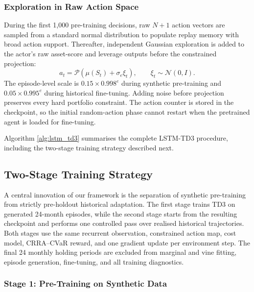 \subsubsection{Exploration in Raw Action Space}
\label{subsubsec:3_exploration}

During the first 1,000 pre-training decisions, raw $N+1$ action vectors are sampled from a standard normal distribution to populate replay memory with broad action support. Thereafter, independent Gaussian exploration is added to the actor's raw asset-score and leverage outputs before the constrained projection:
%
\begin{equation}
a_t=\mathcal{P}\!\left(\mu(S_t)+\sigma_e\xi_t\right),
\qquad \xi_t\sim\mathcal{N}(0,I).
\label{eq:exploration_action}
\end{equation}
%
The episode-level scale is $0.15\times0.998^e$ during synthetic pre-training and $0.05\times0.995^e$ during historical fine-tuning. Adding noise before projection preserves every hard portfolio constraint. The action counter is stored in the checkpoint, so the initial random-action phase cannot restart when the pretrained agent is loaded for fine-tuning.

Algorithm \ref{alg:lstm_td3} summarises the complete LSTM-TD3 procedure, including the two-stage training strategy described next.


\subsection{Two-Stage Training Strategy}
\label{subsec:3_two_stage_training}

A central innovation of our framework is the separation of synthetic pre-training from strictly pre-holdout historical adaptation. The first stage trains TD3 on generated 24-month episodes, while the second stage starts from the resulting checkpoint and performs one controlled pass over realised historical trajectories. Both stages use the same recurrent observation, constrained action map, cost model, CRRA--CVaR reward, and one gradient update per environment step. The final 24 monthly holding periods are excluded from marginal and vine fitting, episode generation, fine-tuning, and all training diagnostics.

\subsubsection{Stage 1: Pre-Training on Synthetic Data}
\label{subsubsec:3_stage1_training}

